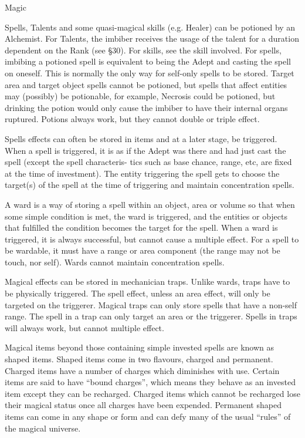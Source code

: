 \begin{Chapter}{Magic}
\begin{Description}

\item[Potion] Spells, Talents and some quasi-magical skills (e.g.
  Healer) can be potioned by an Alchemist.  For Talents, the imbiber
  receives the usage of the talent for a duration dependent on the
  Rank (see §30).  For skills, see the skill involved.  For spells,
  imbibing a potioned spell is equivalent to being the Adept and
  casting the spell on oneself.  This is normally the only way for
  self-only spells to be stored.  Target area and target object spells
  cannot be potioned, but spells that affect entities may (possibly)
  be potionable, for example, Necrosis could be potioned, but drinking
  the potion would only cause the imbiber to have their internal
  organs ruptured.  Potions always work, but they cannot double or
  triple effect.

\item[Investment] Spells effects can often be stored in items and at a
  later stage, be triggered.  When a spell is triggered, it is as if
  the Adept was there and had just cast the spell (except the spell
  characteris- tics such as base chance, range, etc, are fixed at the
  time of investment). The entity triggering the spell gets to choose
  the target(s) of the spell at the time of triggering and maintain
  concentration spells.

\item[Ward] A ward is a way of storing a spell within an object, area
  or volume so that when some simple condition is met, the ward is
  triggered, and the entities or objects that fulfilled the condition
  becomes the target for the spell.  When a ward is triggered, it is
  always successful, but cannot cause a multiple effect. For a spell
  to be wardable, it must have a range or area component (the range
  may not be touch, nor self). Wards cannot maintain concentration
  spells.

\item[Magical Trap] Magical effects can be stored in mechanician
  traps.  Unlike wards, traps have to be physically triggered.  The
  spell effect, unless an area effect, will only be targeted on the
  triggerer.  Magical traps can only store spells that have a non-self
  range.  The spell in a trap can only target an area or the
  triggerer.  Spells in traps will always work, but cannot multiple
  effect.

\item[Shaped Magic] Magical items beyond those containing simple
  invested spells are known as shaped items. Shaped items come in two
  flavours, charged and permanent.  Charged items have a number of
  charges which diminishes with use.  Certain items are said to have
  “bound charges”, which means they behave as an invested item except
  they can be recharged.  Charged items which cannot be recharged lose
  their magical status once all charges have been expended.  Permanent
  shaped items can come in any shape or form and can defy many of the
  usual “rules” of the magical universe.

\end{Description}

\end{Chapter}
